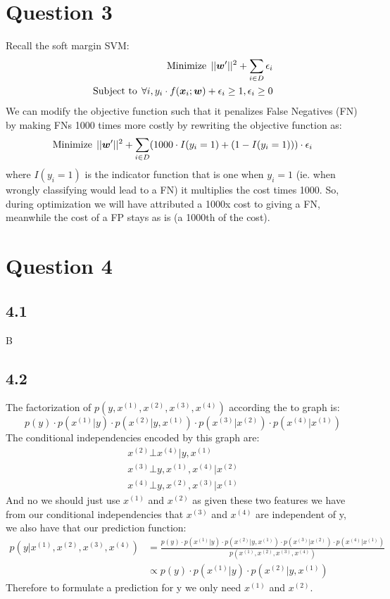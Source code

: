 \section*{Question 3}
Recall the soft margin SVM:
\begin{align}
    \text{Minimize} \: \: || {\bm{w}} '||^{2} + \sum_{i \in D} \epsilon_{i} \\
    \text{Subject to} \: \: \forall i, y_{i} \cdot f({\bm{x}_{i}} ; {\bm{w}}) + \epsilon_{i} \geq 1, \epsilon_{i} \geq 0
\end{align}
We can modify the objective function such that it penalizes False Negatives (FN) by making FNs 1000 times more costly by rewriting the objective function as:
\begin{equation}
    \text{Minimize} \: \: || {\bm{w}} ' ||^{2} + \sum_{i \in D} (1000 \cdot I(y_{i}=1) + (1-I(y_{i}=1))  )\cdot \epsilon_{i}
\end{equation}
where $I(y_{i}=1)$ is the indicator function that is one when $y_{i}=1$ (ie. when wrongly classifying would lead to a FN) it multiplies the cost times 1000. So, during optimization we will have attributed a 1000x cost to giving a FN, meanwhile the cost of a FP stays as is (a 1000th of the cost).

\section*{Question 4}
\subsection*{4.1}
B
\subsection*{4.2}
The factorization of $p(y,x^{(1)},x^{(2)},x^{(3)},x^{(4)})$ according the to graph is:
\begin{equation}
    p(y) \cdot p(x^{(1)}|y) \cdot p(x^{(2)}|y,x^{(1)}) \cdot p(x^{(3)}|x^{(2)}) \cdot p(x^{(4)}|x^{(1)}) 
\end{equation}
The conditional independencies encoded by this graph are:
\begin{align}
    x^{(2)} \bot x^{(4)} | y,x^{(1)} \\
    x^{(3)} \bot y,x^{(1)},x^{(4)} | x^{(2)} \\
    x^{(4)} \bot y, x^{(2)}, x^{(3)} | x^{(1)}
\end{align}
And no we should just use $x^{(1)}$ and $x^{(2)}$ as given these two features we have from our conditional independencies that $x^{(3)}$ and $x^{(4)}$ are independent of y, we also have that our prediction function:
\begin{align}
    p(y|x^{(1)},x^{(2)},x^{(3)},x^{(4)}) &{} = \frac{p(y) \cdot p(x^{(1)}|y) \cdot p(x^{(2)}|y,x^{(1)}) \cdot p(x^{(3)}|x^{(2)}) \cdot p(x^{(4)}|x^{(1)})}{p(x^{(1)},x^{(2)},x^{(3)},x^{(4)})} \\
    &\propto p(y) \cdot p(x^{(1)}|y) \cdot p(x^{(2)}|y,x^{(1)})
\end{align}
Therefore to formulate a prediction for y we only need $x^{(1)}$ and $x^{(2)}$.